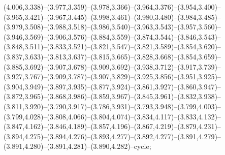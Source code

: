 (4.006,3.338)--(3.977,3.359)--(3.978,3.366)--(3.964,3.376)--(3.954,3.400)--(3.965,3.421)--(3.967,3.445)--(3.998,3.461)--(3.980,3.480)--(3.984,3.485)--(3.979,3.508)--(3.988,3.518)--(3.986,3.540)--(3.963,3.543)--(3.957,3.560)--(3.946,3.569)--(3.906,3.576)--(3.884,3.559)--(3.874,3.544)--(3.846,3.543)--(3.848,3.511)--(3.833,3.521)--(3.821,3.547)--(3.821,3.589)--(3.854,3.620)--(3.837,3.633)--(3.813,3.637)--(3.815,3.665)--(3.828,3.668)--(3.854,3.659)--(3.885,3.692)--(3.907,3.678)--(3.909,3.692)--(3.938,3.712)--(3.917,3.739)--(3.927,3.767)--(3.909,3.787)--(3.907,3.829)--(3.925,3.856)--(3.951,3.925)--(3.904,3.949)--(3.897,3.935)--(3.877,3.924)--(3.861,3.927)--(3.860,3.947)--(3.872,3.965)--(3.868,3.986)--(3.859,3.967)--(3.845,3.961)--(3.832,3.938)--(3.811,3.920)--(3.790,3.917)--(3.786,3.931)--(3.793,3.948)--(3.799,4.003)--(3.799,4.028)--(3.808,4.066)--(3.804,4.074)--(3.834,4.117)--(3.833,4.132)--(3.847,4.162)--(3.846,4.189)--(3.857,4.196)--(3.867,4.219)--(3.879,4.231)--(3.894,4.275)--(3.894,4.276)--(3.893,4.277)--(3.892,4.277)--(3.891,4.279)--(3.891,4.280)--(3.891,4.281)--(3.890,4.282)--cycle;
